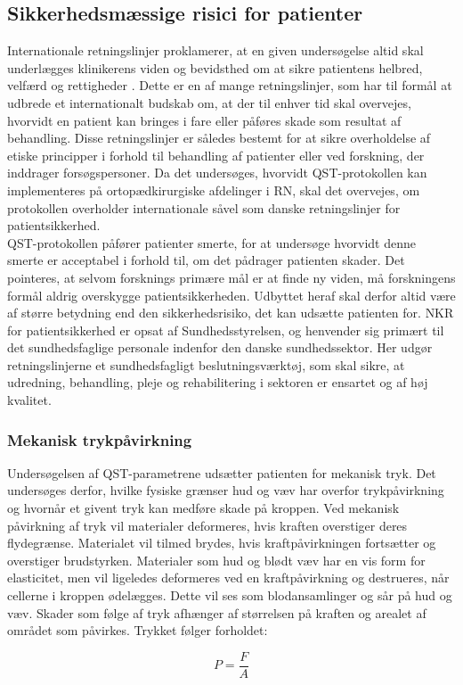 \subsection{Sikkerhedsmæssige risici for patienter}
Internationale retningslinjer proklamerer, at en given undersøgelse altid skal underlægges klinikerens viden og bevidsthed om at sikre patientens helbred, velfærd og rettigheder \citep{helsinki2013}. Dette er en af mange retningslinjer, som har til formål at udbrede et internationalt budskab om, at der til enhver tid skal overvejes, hvorvidt en patient kan bringes i fare eller påføres skade som resultat af behandling. Disse retningslinjer er således bestemt for at sikre overholdelse af etiske principper i forhold til behandling af patienter eller ved forskning, der inddrager forsøgspersoner. Da det undersøges, hvorvidt QST-protokollen kan implementeres på ortopædkirurgiske afdelinger i RN, skal det overvejes, om protokollen overholder internationale såvel som danske retningslinjer for patientsikkerhed. \citep{helsinki2013} \\
QST-protokollen påfører patienter smerte, for at undersøge hvorvidt denne smerte er acceptabel i forhold til, om det pådrager patienten skader. Det pointeres, at selvom forsknings primære mål er at finde ny viden, må forskningens formål aldrig overskygge patientsikkerheden. Udbyttet heraf skal derfor altid være af større betydning end den sikkerhedsrisiko, det kan udsætte patienten for. \citep{helsinki2013} NKR for patientsikkerhed er opsat af Sundhedsstyrelsen, og henvender sig primært til det sundhedsfaglige personale indenfor den danske sundhedssektor. Her udgør retningslinjerne et sundhedsfagligt beslutningsværktøj, som skal sikre, at udredning, behandling, pleje og rehabilitering i sektoren er ensartet og af høj kvalitet. \citep{nkr2016} \citep{kommissorium2012} \\

\subsubsection{Mekanisk trykpåvirkning}
Undersøgelsen af QST-parametrene udsætter patienten for mekanisk tryk. Det undersøges derfor, hvilke fysiske grænser hud og væv har overfor trykpåvirkning og hvornår et givent tryk kan medføre skade på kroppen. Ved mekanisk påvirkning af tryk vil materialer deformeres, hvis kraften overstiger deres flydegrænse. Materialet vil tilmed brydes, hvis kraftpåvirkningen fortsætter og overstiger brudstyrken. Materialer som hud og blødt væv har en vis form for elasticitet, men vil ligeledes deformeres ved en kraftpåvirkning og destrueres, når cellerne i kroppen ødelægges. Dette vil ses som blodansamlinger og sår på hud og væv. Skader som følge af tryk afhænger af størrelsen på kraften og arealet af området som påvirkes. Trykket følger forholdet: 
\begin{center}
	\begin{equation}
	P=\frac{F}{A}
	\end{equation}
\end{center}

